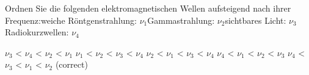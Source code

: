 \documentclass[11pt]{exam}
\begin{document}
\begin{questions}
\vspace{3mm}\question Ordnen Sie die folgenden elektromagnetischen Wellen aufsteigend nach ihrer Frequenz:weiche Röntgenstrahlung: \( \nu_1 \)Gammastrahlung: \( \nu_2 \)sichtbares Licht: \( \nu_3 \)Radiokurzwellen: \( \nu_4 \)

\begin{choices}
	\choice \( \nu_3 \) < \( \nu_4 \) < \( \nu_2 \) < \( \nu_1 \)
	\choice \( \nu_1 \) < \( \nu_2 \) < \( \nu_3 \) < \( \nu_4 \)
	\choice \( \nu_2 \) < \( \nu_1 \) < \( \nu_3 \) < \( \nu_4 \)
	\choice \( \nu_4 \) < \( \nu_1 \) < \( \nu_2 \) < \( \nu_3 \)
	\choice \( \nu_4 \) < \( \nu_3 \) < \( \nu_1 \) < \( \nu_2 \) (correct)
\end{choices}

\vspace{3mm}\end{questions}
\end{document}
